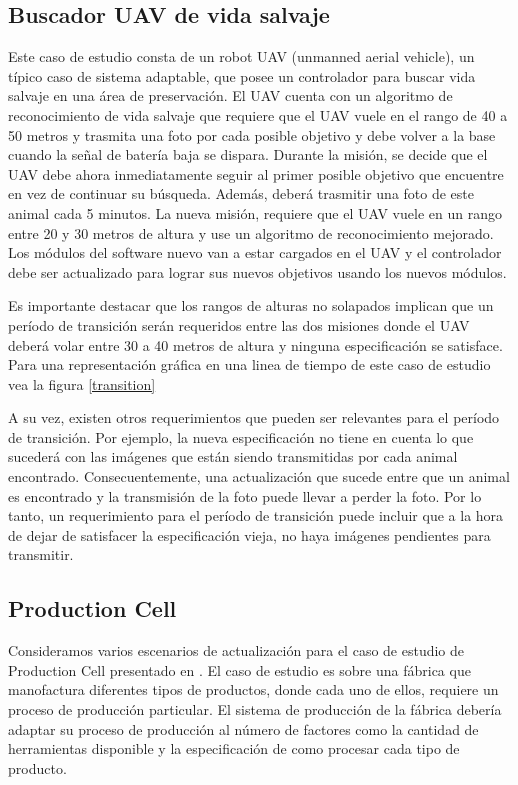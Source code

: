 \subsection{Buscador UAV de vida salvaje}
\label{buscador_UAV}

Este caso de estudio consta de un robot UAV (unmanned aerial vehicle), un típico caso de sistema adaptable, que posee un
controlador para buscar vida salvaje en una área de preservación. El UAV cuenta con un algoritmo de reconocimiento de
vida salvaje que requiere que el UAV vuele en el rango de 40 a 50 metros y trasmita una foto por cada posible objetivo y
debe volver a la base cuando la señal de batería baja se dispara. Durante la misión, se decide que el UAV debe ahora
inmediatamente seguir al primer posible objetivo que encuentre en vez de continuar su búsqueda. Además, deberá trasmitir
una foto de este animal cada 5 minutos. La nueva misión, requiere que el UAV vuele en un rango entre 20 y 30 metros de
altura y use un algoritmo de reconocimiento mejorado. Los módulos del software nuevo van a estar cargados en el UAV y el
controlador debe ser actualizado para lograr sus nuevos objetivos usando los nuevos módulos.

Es importante destacar que los rangos de alturas no solapados implican que un período de transición serán requeridos
entre las dos misiones donde el UAV deberá volar entre 30 a 40 metros de altura y ninguna especificación se satisface.
Para una representación gráfica en una linea de tiempo de este caso de estudio vea la figura \ref{transition}

A su vez, existen otros requerimientos que pueden ser relevantes para el período de transición. Por ejemplo, la nueva
especificación no tiene en cuenta lo que sucederá con las imágenes que están siendo transmitidas por cada animal
encontrado. Consecuentemente, una actualización que sucede entre que un animal es encontrado y la transmisión de la foto
puede llevar a perder la foto. Por lo tanto, un requerimiento para el período de transición puede incluir que a la hora
de dejar de satisfacer la especificación vieja, no haya imágenes pendientes para transmitir.


\subsection{Production Cell}

Consideramos varios escenarios de actualización para el caso de estudio de Production Cell presentado en
\cite{Lewerentz:1995:646391}. El caso de estudio es sobre una fábrica que manofactura diferentes tipos de productos,
donde cada uno de ellos, requiere un proceso de producción particular. El sistema de producción de la fábrica debería
adaptar su proceso de producción al número de factores como la cantidad de herramientas disponible y la especificación
de como procesar cada tipo de producto. 


